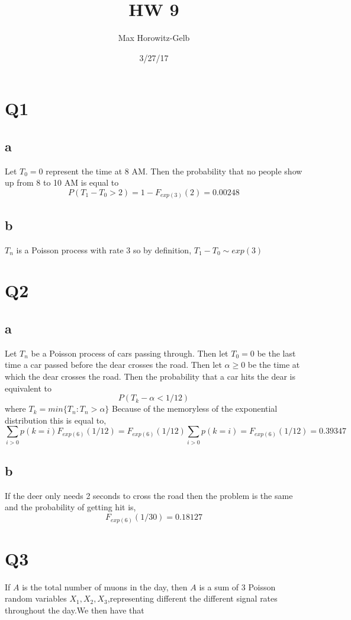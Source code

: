\documentclass{article}
\title{HW 9}
\date{3/27/17}
\author{Max Horowitz-Gelb}
\begin{document}
\setlength{\parskip}{5pt}
\setlength{\parindent}{0pt}

\maketitle
\section*{Q1}
\subsection*{a}
Let $T_0 = 0$ represent the time at 8 AM. Then the probability that no people show up from 8 to 10 AM is equal to 
$$
P(T_1-T_0 > 2) = 1 - F_{exp(3)}(2) = 0.00248
$$ 

\subsection*{b}
$T_n$ is a Poisson process with rate 3 so by definition, $T_1 - T_0 \sim exp(3)$

\section*{Q2}
\subsection*{a}
Let $T_n$ be a Poisson process of cars passing through. Then let $T_0 = 0$ be the last time a car passed before the dear crosses the road. Then let $\alpha \geq 0$ be the time at which the dear crosses the road.
Then the probability that a car hits the dear is equivalent to 
$$
P(T_{k} - \alpha < 1/12)
$$ where $T_k = min\{T_n : T_n > \alpha\}$
Because of the memoryless of the exponential distribution this is equal to, 
$$
\sum_{i > 0} p(k = i)F_{exp(6)}(1/12) = F_{exp(6)}(1/12) \sum_{i > 0} p(k = i) = F_{exp(6)}(1/12) = 0.39347
$$
\subsection*{b}
If the deer only needs 2 seconds to cross the road then the problem is the same and the probability of getting hit is,
$$
F_{exp(6)}(1/30) = 0.18127
$$

\section*{Q3}
If $A$ is the total number of muons in the day, then $A$ is a sum of 3 Poisson random variables $X_1, X_2, X_3$,representing different the different signal rates throughout the day.We then have that 
\end{document}

